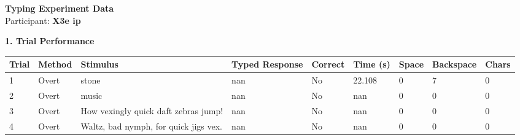 \documentclass[10pt,a4paper]{article}
\begin{document}

\begin{center}
    {\Large\bfseries Typing Experiment Data}\\
    \vspace{2pt}
    Participant: \textbf{X3e ip}
\end{center}

\vspace{0.25cm}


\noindent
{\large\bfseries 1. Trial Performance}

\vspace{0.08cm}

\begin{center}
\begin{tabularx}{\textwidth}{
    C{0.45in}
    C{0.65in}
    L{2.35in}
    L{2.55in}
    C{0.65in}
    C{0.65in}
    C{0.55in}
    C{0.75in}
    C{0.55in}
}
\toprule

\textbf{Trial} &
\textbf{Method} &
\textbf{Stimulus} &
\textbf{Typed Response} &
\textbf{Correct} &
\textbf{Time (s)} &
\textbf{Space} &
\textbf{Backspace} &
\textbf{Chars}
\\

\midrule

1 &
Overt &
stone &
nan &
No &
22.108 &
0 &
7 &
0
\\

2 &
Overt &
music &
nan &
No &
nan &
0 &
0 &
0
\\

3 &
Overt &
How vexingly quick daft zebras jump! &
nan &
No &
nan &
0 &
0 &
0
\\

4 &
Overt &
Waltz, bad nymph, for quick jigs vex. &
nan &
No &
nan &
0 &
0 &
0
\\

\bottomrule
\end{tabularx}
\end{center}

\vspace{0.35cm}

\end{document}
